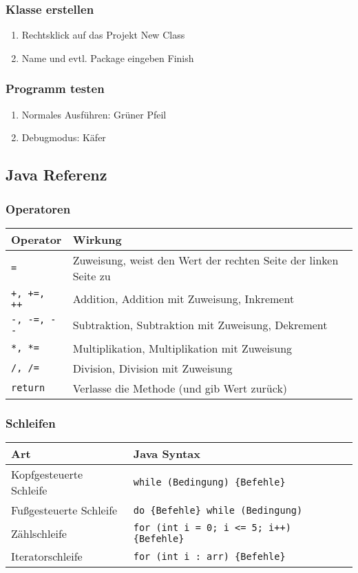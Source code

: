 		\subsubsection{Klasse erstellen}
		\begin{enumerate}
		\item Rechtsklick auf das Projekt \frqq New \frqq Class
		\item Name und evtl. Package eingeben \frqq Finish
		\end{enumerate}

		\subsubsection{Programm testen}
		\begin{enumerate}
		\item Normales Ausführen: Grüner Pfeil
		\item Debugmodus: Käfer
		\end{enumerate}

	\subsection{Java Referenz}
		\subsubsection{Operatoren}
		\begin{tabular}{ll}
		\textbf{Operator} & \textbf{Wirkung}\\
		\hline
		\lstinline$=$ & Zuweisung, weist den Wert der rechten Seite der linken Seite zu\\
		\lstinline$+, +=, ++$ & Addition, Addition mit Zuweisung, Inkrement\\
		\lstinline$-, -=, --$ & Subtraktion, Subtraktion mit Zuweisung, Dekrement\\
		\lstinline$*, *=$ & Multiplikation, Multiplikation mit Zuweisung\\
		\lstinline$/, /=$ & Division, Division mit Zuweisung\\
		\lstinline$return$ & Verlasse die Methode (und gib Wert zurück)\\
		\end{tabular}

		\subsubsection{Schleifen}
		\begin{tabular}{ll}
		\textbf{Art} & \textbf{Java Syntax}\\
		\hline
		Kopfgesteuerte Schleife & \lstinline$while (Bedingung) {Befehle}$\\
		Fußgesteuerte Schleife & \lstinline$do {Befehle} while (Bedingung)$\\
		Zählschleife & \lstinline$for (int i = 0; i <= 5; i++) {Befehle}$\\
		Iteratorschleife & \lstinline$for (int i : arr) {Befehle}$\\
		
		\end{tabular}

